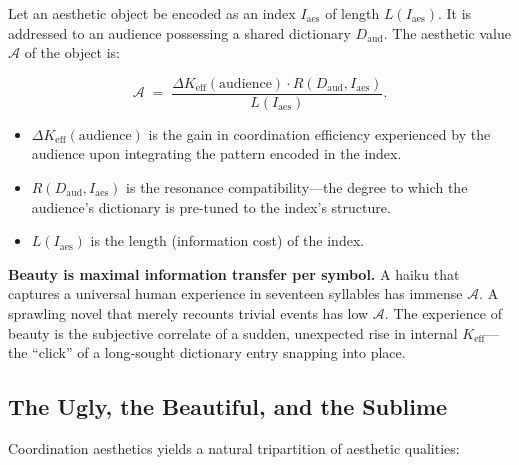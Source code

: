 \documentclass[12pt,a4paper]{article}
\newcommand{\Keff}{K_{\mathrm{eff}}}
\begin{document}
	Let an aesthetic object be encoded as an index $I_{\mathrm{aes}}$ of length $L(I_{\mathrm{aes}})$. It is addressed to an audience possessing a shared dictionary $D_{\mathrm{aud}}$. The aesthetic value $\mathcal{A}$ of the object is:
	
	\[
	\mathcal{A} \; = \; \frac{\Delta\Keff(\text{audience}) \cdot R(D_{\mathrm{aud}}, I_{\mathrm{aes}})}{L(I_{\mathrm{aes}})}.
	\]
	
	\begin{itemize}[leftmargin=*]
		\item $\Delta\Keff(\text{audience})$ is the gain in coordination efficiency experienced by the audience upon integrating the pattern encoded in the index.
		\item $R(D_{\mathrm{aud}}, I_{\mathrm{aes}})$ is the resonance compatibility---the degree to which the audience’s dictionary is pre‑tuned to the index’s structure.
		\item $L(I_{\mathrm{aes}})$ is the length (information cost) of the index.
	\end{itemize}
	
	\textbf{Beauty is maximal information transfer per symbol.} A haiku that captures a universal human experience in seventeen syllables has immense $\mathcal{A}$. A sprawling novel that merely recounts trivial events has low $\mathcal{A}$. The experience of beauty is the subjective correlate of a sudden, unexpected rise in internal $K_{\mathrm{eff}}$---the ``click'' of a long‑sought dictionary entry snapping into place.
	
	\subsection{The Ugly, the Beautiful, and the Sublime}
	
	Coordination aesthetics yields a natural tripartition of aesthetic qualities:
	
\end{document}
